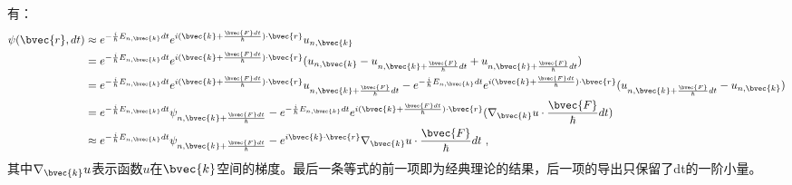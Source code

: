 有：
\begin{equation}
\begin{aligned}
\psi(\bvec{r},dt)&\approx e^{-\frac{i}{\hbar}E_{n,\bvec{k}}dt}e^{i(\bvec{k}+\frac{\bvec{F}dt}{\hbar})\cdot \bvec{r}}u_{n,\bvec{k}}\\
&=e^{-\frac{i}{\hbar}E_{n,\bvec{k}}dt}e^{i(\bvec{k}+\frac{\bvec{F}dt}{\hbar})\cdot \bvec{r}}(u_{n,\bvec{k}}-u_{n,\bvec{k}+\frac{\bvec{F}}{\hbar}dt}+u_{n,\bvec{k}+\frac{\bvec{F}}{\hbar}dt})\\
&=e^{-\frac{i}{\hbar}E_{n,\bvec{k}}dt}e^{i(\bvec{k}+\frac{\bvec{F}dt}{\hbar})\cdot \bvec{r}}u_{n,\bvec{k}+\frac{\bvec{F}}{\hbar}dt}-e^{-\frac{i}{\hbar}E_{n,\bvec{k}}dt}e^{i(\bvec{k}+\frac{\bvec{F}dt}{\hbar})\cdot \bvec{r}}(u_{n,\bvec{k}+\frac{\bvec{F}}{\hbar}dt}-u_{n,\bvec{k}})\\
&=e^{-\frac{i}{\hbar}E_{n,\bvec{k}}dt}\psi_{n,\bvec{k}+\frac{\bvec{F}dt}{\hbar}}-e^{-\frac{i}{\hbar}E_{n,\bvec{k}}dt}e^{i(\bvec{k}+\frac{\bvec{F}dt}{\hbar})\cdot \bvec{r}}(\nabla_{\bvec{k}} u\cdot \frac{\bvec{F}}{\hbar}dt)\\
&\approx e^{-\frac{i}{\hbar}E_{n,\bvec{k}}dt}\psi_{n,\bvec{k}+\frac{\bvec{F}dt}{\hbar}}-e^{i\bvec{k}\cdot\bvec{r}}\nabla_{\bvec{k}} u\cdot \frac{\bvec{F}}{\hbar}dt~,
\end{aligned}
\end{equation}
其中$\nabla_{\bvec{k}} u$表示函数$u$在$\bvec{k}$空间的梯度。最后一条等式的前一项即为经典理论的结果，后一项的导出只保留了dt的一阶小量。
